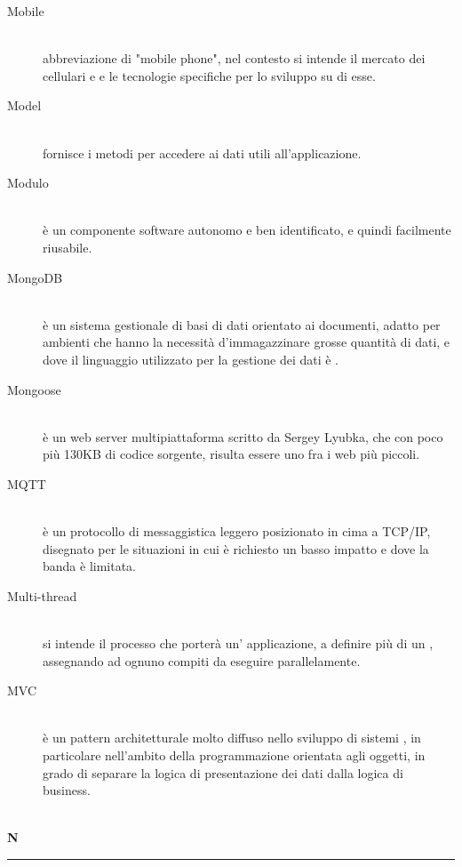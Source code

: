 \documentclass[12pt,a4paper]{article}
\begin{document}
\begin{description}
\item[Mobile] 
\hfill\\ abbreviazione di "mobile phone", nel contesto si intende il mercato dei cellulari e  e le tecnologie specifiche per lo sviluppo su di esse.

\item[Model] 
\hfill\\ fornisce i metodi per accedere ai dati utili all'applicazione.

\item[Modulo] 
\hfill\\ è un componente software autonomo e ben identificato, e quindi facilmente riusabile.

\item[MongoDB] 
\hfill\\ è un sistema gestionale di basi di dati  orientato ai documenti, adatto per ambienti che hanno la necessità d'immagazzinare grosse quantità di dati, e dove il linguaggio utilizzato per la gestione dei dati è .

\item[Mongoose] 
\hfill\\ è un web server multipiattaforma scritto da Sergey Lyubka, che con poco più 130KB di codice sorgente, risulta essere uno fra i  web più piccoli.

\item[MQTT] 
\hfill\\ è un protocollo di messaggistica leggero posizionato in cima a TCP/IP, disegnato per le situazioni in cui è richiesto un basso impatto e dove la banda è limitata.

\item[Multi-thread] 
\hfill\\ si intende il processo che porterà un' applicazione, a definire più di un , assegnando ad ognuno compiti da eseguire parallelamente.

\item[MVC] 
\hfill\\ è un pattern architetturale molto diffuso nello sviluppo di sistemi , in particolare nell'ambito della programmazione orientata agli oggetti, in grado di separare la logica di presentazione dei dati dalla logica di business.
\end{description}

\newpage

\begin{center}
\hfill\\
	\LARGE \textbf{N}
\hfill\\
\rule[15pt]{30pt}{0.5pt}
\end{center}
\end{document}
